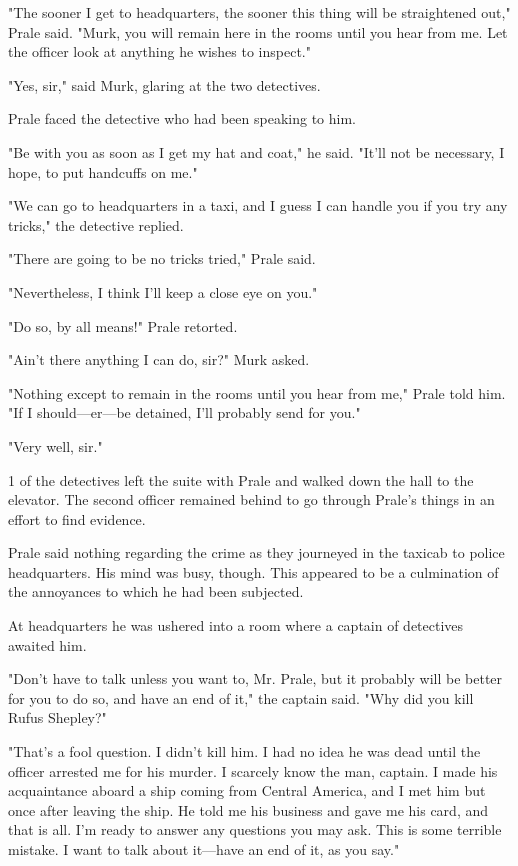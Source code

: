 \documentclass{novel}
\begin{document}
"The sooner I get to headquarters, the sooner this thing will be straightened out," Prale said. "Murk, you will remain here in the rooms until you hear from me. Let the officer look at anything he wishes to inspect."

"Yes, sir," said Murk, glaring at the two detectives.

Prale faced the detective who had been speaking to him.

"Be with you as soon as I get my hat and coat," he said. "It'll not be necessary, I hope, to put handcuffs on me."

"We can go to headquarters in a taxi, and I guess I can handle you if you try any tricks," the detective replied.

"There are going to be no tricks tried," Prale said.

"Nevertheless, I think I'll keep a close eye on you."

"Do so, by all means!" Prale retorted.

"Ain't there anything I can do, sir?" Murk asked.

"Nothing except to remain in the rooms until you hear from me," Prale told him. "If I should---er---be detained, I'll probably send for you."

"Very well, sir."

1 of the detectives left the suite with Prale and walked down the hall to the elevator. The second officer remained behind to go through Prale's things in an effort to find evidence.

Prale said nothing regarding the crime as they journeyed in the taxicab to police headquarters. His mind was busy, though. This appeared to be a culmination of the annoyances to which he had been subjected.

At headquarters he was ushered into a room where a captain of detectives awaited him.

"Don't have to talk unless you want to, Mr. Prale, but it probably will be better for you to do so, and have an end of it," the captain said. "Why did you kill Rufus Shepley?"

"That's a fool question. I didn't kill him. I had no idea he was dead until the officer arrested me for his murder. I scarcely know the man, captain. I made his acquaintance aboard a ship coming from Central America, and I met him but once after leaving the ship. He told me his business and gave me his card, and that is all. I'm ready to answer any questions you may ask. This is some terrible mistake. I want to talk about it---have an end of it, as you say."
\end{document}
